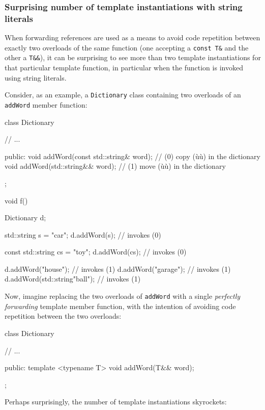 \subsubsection[Surprising number of template instantiations with string literals]{Surprising number of template instantiations with string literals}\label{surprising-number-of-template-instantiations-with-string-literals}

When forwarding references are used as a means to avoid code repetition
between exactly two overloads of the same function (one accepting a
\texttt{const}~\texttt{T\&} and the other a \texttt{T\&\&}), it can be
surprising to see more than two template instantiations for that
particular template function, in particular when the function is invoked
using string literals.

Consider, as an example, a \texttt{Dictionary} class containing two
overloads of an \texttt{addWord} member function:

\begin{emcppslisting}
class Dictionary
{
    // ...

public:
    void addWord(const std::string& word);  // (0) copy (ù{}ù) in the dictionary
    void addWord(std::string&& word);       // (1) move (ù{}ù) in the dictionary
};

void f()
{
    Dictionary d;

    std::string s = "car";
    d.addWord(s);                    // invokes (0)

    const std::string cs = "toy";
    d.addWord(cs);                   // invokes (0)

    d.addWord("house");              // invokes (1)
    d.addWord("garage");             // invokes (1)
    d.addWord(std::string{"ball"});  // invokes (1)
}
\end{emcppslisting}

\noindent Now, imagine replacing the two overloads of \texttt{addWord} with a
single \textit{perfectly forwarding} template member function, with the intention
of avoiding code repetition between the two overloads:

\begin{emcppslisting}
class Dictionary
{
    // ...

public:
    template <typename T>
    void addWord(T&& word);
};
\end{emcppslisting}

\noindent Perhaps surprisingly, the number of template instantiations skyrockets:

